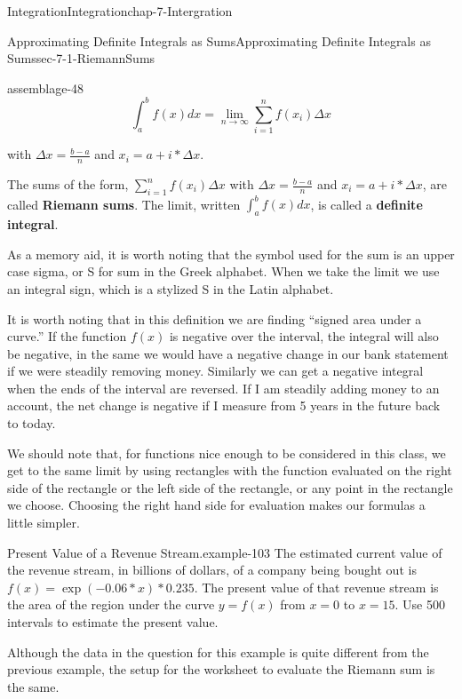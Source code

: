 \documentclass[oneside,10pt,]{book}
\newcommand{\terminology}[1]{\textbf{#1}}
\numberwithin{equation}{section}
\begin{document}
\begin{chapterptx}{Integration}{}{Integration}{}{}{chap-7-Intergration}
\begin{sectionptx}{Approximating Definite Integrals as Sums}{}{Approximating Definite Integrals as Sums}{}{}{sec-7-1-RiemannSums}
\begin{assemblage}{}{assemblage-48}%
\hypertarget{p-2562}{}%
%
\begin{equation*}
\int_a^bf(x)  dx=\lim_{n\to \infty} \sum_{i=1}^nf (x_i)\Delta x 
\end{equation*}
%
\par
\hypertarget{p-2563}{}%
with \(\Delta x=\frac{b-a}{n}\)  and  \(x_i=a+i*\Delta x\).%
\end{assemblage}
\hypertarget{p-2564}{}%
The sums of the form, \(\sum_{i=1}^n  f(x_i)\Delta x\) with \(\Delta x=\frac{b-a}{n}\) and \(x_i=a+i*\Delta x\), are called \terminology{Riemann sums}.  The limit, written \(\int_a^bf(x)  dx\), is called a \terminology{definite integral}.%
\par
\hypertarget{p-2565}{}%
As a memory aid, it is worth noting that the symbol used for the sum is an upper case sigma, or S for sum in the Greek alphabet.  When we take the limit we use an integral sign, which is a stylized S in the Latin alphabet.%
\par
\hypertarget{p-2566}{}%
It is worth noting that in this definition we are finding “signed area under a curve.”  If the function \(f(x)\) is negative over the interval, the integral will also be negative, in the same we would have a negative change in our bank statement if we were steadily removing money.  Similarly we can get a negative integral when the ends of the interval are reversed.  If I am steadily adding money to an account, the net change is negative if I measure from 5 years in the future back to today.%
\par
\hypertarget{p-2567}{}%
We should note that, for functions nice enough to be considered in this class, we get to the same limit by using rectangles with the function evaluated on the right side of the rectangle or the left side of the rectangle, or any point in the rectangle we choose.  Choosing the right hand side for evaluation makes our formulas a little simpler.%
\begin{example}{Present Value of a Revenue Stream.}{example-103}%
\hypertarget{p-2568}{}%
The estimated current value of the revenue stream, in billions of dollars, of a company being bought out is \(f(x)=\exp(-0.06*x)*0.235\). The present value of that revenue stream is the area of the region under the curve \(y=f(x)\) from \(x=0\) to \(x=15\).  Use 500 intervals to estimate the present value.%
\par
\hypertarget{p-2569}{}%
Although the data in the question for this example is quite different from the previous example, the setup for the worksheet to evaluate the Riemann sum is the same.%

\end{example}
\end{sectionptx}
\end{chapterptx}
\end{document}
